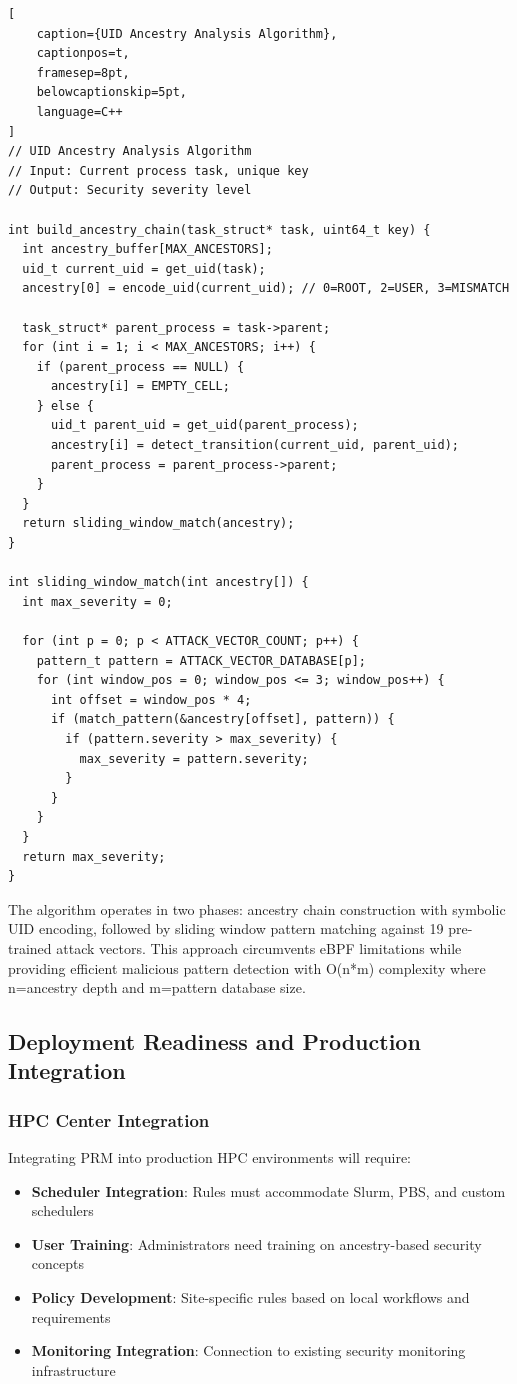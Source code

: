 \documentclass[]{sn-jnl}
\begin{document}
\begin{lstlisting}[
    caption={UID Ancestry Analysis Algorithm},
    captionpos=t,
    framesep=8pt,
    belowcaptionskip=5pt,
    language=C++
]
// UID Ancestry Analysis Algorithm
// Input: Current process task, unique key
// Output: Security severity level

int build_ancestry_chain(task_struct* task, uint64_t key) {
  int ancestry_buffer[MAX_ANCESTORS];
  uid_t current_uid = get_uid(task);
  ancestry[0] = encode_uid(current_uid); // 0=ROOT, 2=USER, 3=MISMATCH
  
  task_struct* parent_process = task->parent;
  for (int i = 1; i < MAX_ANCESTORS; i++) {
    if (parent_process == NULL) {
      ancestry[i] = EMPTY_CELL;
    } else {
      uid_t parent_uid = get_uid(parent_process);
      ancestry[i] = detect_transition(current_uid, parent_uid);
      parent_process = parent_process->parent;
    }
  }
  return sliding_window_match(ancestry);
}

int sliding_window_match(int ancestry[]) {
  int max_severity = 0;
  
  for (int p = 0; p < ATTACK_VECTOR_COUNT; p++) {
    pattern_t pattern = ATTACK_VECTOR_DATABASE[p];
    for (int window_pos = 0; window_pos <= 3; window_pos++) {
      int offset = window_pos * 4;
      if (match_pattern(&ancestry[offset], pattern)) {
        if (pattern.severity > max_severity) {
          max_severity = pattern.severity;
        }
      }
    }
  }
  return max_severity;
}
\end{lstlisting}

The algorithm operates in two phases: ancestry chain construction with symbolic
UID encoding, followed by sliding window pattern matching against 19 pre-trained
attack vectors. This approach circumvents eBPF limitations while providing
efficient malicious pattern detection with O(n*m) complexity where n=ancestry
depth and m=pattern database size.

\subsection{Deployment Readiness and Production Integration}

\subsubsection{HPC Center Integration}

Integrating PRM into production HPC environments will require:
\begin{itemize}
\item \textbf{Scheduler Integration}: Rules must accommodate Slurm, PBS, and
      custom schedulers
\item \textbf{User Training}: Administrators need training on ancestry-based
      security concepts
\item \textbf{Policy Development}: Site-specific rules based on local workflows
      and requirements
\item \textbf{Monitoring Integration}: Connection to existing security monitoring
      infrastructure
\end{itemize}
\end{document}
